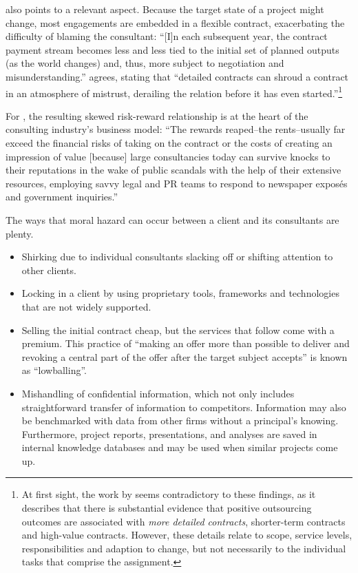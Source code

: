 \documentclass[12pt]{article}
\begin{document}
\citet[9]{mcfarlan1995} also points to a relevant aspect. Because the
target state of a project might change, most engagements are embedded in
a flexible contract, exacerbating the difficulty of blaming the
consultant: ``{[}I{]}n each subsequent year, the contract payment stream
becomes less and less tied to the initial set of planned outputs (as the
world changes) and, thus, more subject to negotiation and
misunderstanding.'' \citet[924]{nooteboom1996} agrees, stating that
``detailed contracts can shroud a contract in an atmosphere of mistrust,
derailing the relation before it has even started.''\footnote{At first
  sight, the work by \citet[4]{lacity2012} seems contradictory to these
  findings, as it describes that there is substantial evidence that
  positive outsourcing outcomes are associated with \emph{more detailed
  contracts}, shorter-term contracts and high-value contracts. However,
  these details relate to scope, service levels, responsibilities and
  adaption to change, but not necessarily to the individual tasks that
  comprise the assignment.}

For \citet[145]{mazzucato2023}, the resulting skewed risk-reward
relationship is at the heart of the consulting industry's business
model: ``The rewards reaped--the rents--usually far exceed the financial
risks of taking on the contract or the costs of creating an impression
of value {[}because{]} large consultancies today can survive knocks to
their reputations in the wake of public scandals with the help of their
extensive resources, employing savvy legal and PR teams to respond to
newspaper exposés and government inquiries.''

The ways that moral hazard can occur between a client and its
consultants are plenty.

\begin{itemize}
\item
  Shirking due to individual consultants slacking off or shifting
  attention to other clients.
\item
  Locking in a client by using proprietary tools, frameworks and
  technologies that are not widely supported.
\item
  Selling the initial contract cheap, but the services that follow come
  with a premium. This practice of ``making an offer more than possible
  to deliver and revoking a central part of the offer after the target
  subject accepts'' \citep[ 219]{motes1979} is known as ``lowballing''.
\item
  Mishandling of confidential information, which not only includes
  straightforward transfer of information to competitors. Information
  may also be benchmarked with data from other firms without a
  principal's knowing. Furthermore, project reports, presentations, and
  analyses are saved in internal knowledge databases and may be used
  when similar projects come up. \citep[ 72-73]{armbruster2006}
\end{itemize}
\end{document}
